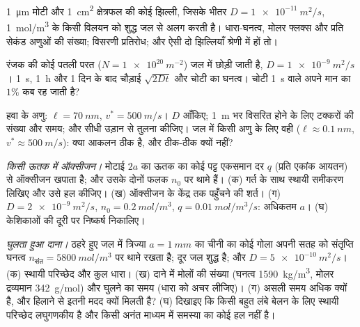 \begin{exercise}[$\star$]\label{exo:b2:particle-diffusion:2}
\qty{1}{\micro m} मोटी और \qty{1}{cm^2} क्षेत्रफल की कोई झिल्ली, जिसके भीतर $D =
\qty{1e-11}{m^2/s}$, \qty{1}{mol/m^3} के किसी विलयन को
शुद्ध जल से अलग करती है। धारा-घनत्व, मोलर फ्लक्स और प्रति सेकंड अणुओं की
संख्या; विसरणी प्रतिरोध; और ऐसी दो झिल्लियाँ श्रेणी में हों तो।
\end{exercise}

\begin{exercise}[$\star$]\label{exo:b2:particle-diffusion:3}
रंजक की कोई पतली परत ($N = \qty{1e20}{m^{-2}}$) जल में छोड़ी जाती है,
$D = \qty{1e-9}{m^2/s}$। \qty{1}{s}, \qty{1}{h} और \num{1} दिन के बाद
चौड़ाई $\sqrt{2Dt}$ और चोटी का घनत्व। चोटी \qty{1}{s} वाले अपने मान का
$1\%$ कब रह जाती है?
\end{exercise}

\begin{exercise}[$\star$]\label{exo:b2:particle-diffusion:4}
हवा के अणु: $\ell = \qty{70}{nm}$, $v^* = \qty{500}{m/s}$।
$D$ आँकिए; \qty{1}{m} भर विसरित होने के लिए टक्करों की संख्या और समय; और
सीधी उड़ान से तुलना कीजिए। जल में किसी अणु के लिए वही ($\ell \approx
\qty{0.1}{nm}$, $v^* \approx \qty{500}{m/s}$): क्या आकलन ठीक है, और
ठीक-ठीक क्यों नहीं?
\end{exercise}

\begin{exercise}[$\star\star$]\label{exo:b2:particle-diffusion:5}
\emph{किसी ऊतक में ऑक्सीजन।} मोटाई $2a$ का ऊतक का कोई पट्ट
एकसमान दर $q$ (प्रति एकांक आयतन) से ऑक्सीजन खपाता है; और उसके दोनों फलक
$n_0$ पर थामे हैं। (क) गर्त के साथ स्थायी समीकरण लिखिए और उसे
हल कीजिए। (ख) ऑक्सीजन के केंद्र तक पहुँचने की शर्त। (ग) $D = \qty{2e-9}{m^2/s}$,
$n_0 = \qty{0.2}{mol/m^3}$, $q = \qty{0.01}{mol/m^3/s}$: अधिकतम $a$। (घ)
केशिकाओं की दूरी पर निष्कर्ष निकालिए।
\end{exercise}

\begin{exercise}[$\star\star$]\label{exo:b2:particle-diffusion:6}
\emph{घुलता हुआ दाना।} ठहरे हुए जल में त्रिज्या $a = \qty{1}{mm}$ का चीनी का कोई
गोला अपनी सतह को संतृप्ति घनत्व $n_{\text{संत}}
= \qty{5800}{mol/m^3}$ पर थामे रखता है; दूर जल शुद्ध है; और $D =
\qty{5e-10}{m^2/s}$। (क) स्थायी परिच्छेद और कुल धारा। (ख)
दाने में मोलों की संख्या (घनत्व \qty{1590}{kg/m^3}, मोलर द्रव्यमान
\qty{342}{g/mol}) और घुलने का समय (धारा को अचर लीजिए)।
(ग) असली समय अधिक क्यों है, और हिलाने से इतनी मदद क्यों मिलती है?
(घ) दिखाइए कि किसी बहुत लंबे बेलन के लिए स्थायी परिच्छेद
लघुगणकीय है और किसी अनंत माध्यम में समस्या का कोई हल नहीं है।
\end{exercise}

